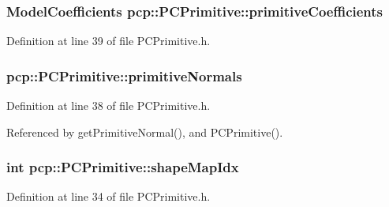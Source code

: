 \hypertarget{classpcp_1_1PCPrimitive_adb0f70b618dddbff203bccd1fa071782}{
\subsubsection[{primitive\-Coefficients}]{\setlength{\rightskip}{0pt plus 5cm}Model\-Coefficients pcp\-::\-P\-C\-Primitive\-::primitive\-Coefficients\hspace{0.3cm}{\ttfamily [private]}}}\label{classpcp_1_1PCPrimitive_adb0f70b618dddbff203bccd1fa071782}


Definition at line 39 of file P\-C\-Primitive.\-h.

\hypertarget{classpcp_1_1PCPrimitive_a96359fda0d8c70e3b074d97bde90b282}{
\subsubsection[{primitive\-Normals}]{ pcp\-::\-P\-C\-Primitive\-::primitive\-Normals\hspace{0.3cm}{\ttfamily [private]}}}\label{classpcp_1_1PCPrimitive_a96359fda0d8c70e3b074d97bde90b282}


Definition at line 38 of file P\-C\-Primitive.\-h.



Referenced by get\-Primitive\-Normal(), and P\-C\-Primitive().

\hypertarget{classpcp_1_1PCPrimitive_a809c274d155e9b552cf02a0687b7cc11}{
\subsubsection[{shape\-Map\-Idx}]{\setlength{\rightskip}{0pt plus 5cm}int pcp\-::\-P\-C\-Primitive\-::shape\-Map\-Idx\hspace{0.3cm}{\ttfamily [private]}}}\label{classpcp_1_1PCPrimitive_a809c274d155e9b552cf02a0687b7cc11}


Definition at line 34 of file P\-C\-Primitive.\-h.



